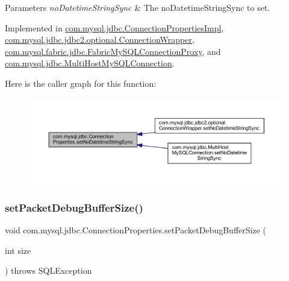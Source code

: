 \begin{DoxyParams}{Parameters}
{\em no\+Datetime\+String\+Sync} & The no\+Datetime\+String\+Sync to set. \\
\hline
\end{DoxyParams}


Implemented in \mbox{\hyperlink{classcom_1_1mysql_1_1jdbc_1_1_connection_properties_impl_acd5096d201db849e11a80ddfb49c5c7e}{com.\+mysql.\+jdbc.\+Connection\+Properties\+Impl}}, \mbox{\hyperlink{classcom_1_1mysql_1_1jdbc_1_1jdbc2_1_1optional_1_1_connection_wrapper_a5df2417575df4f6bdb7ba14ffc39b979}{com.\+mysql.\+jdbc.\+jdbc2.\+optional.\+Connection\+Wrapper}}, \mbox{\hyperlink{classcom_1_1mysql_1_1fabric_1_1jdbc_1_1_fabric_my_s_q_l_connection_proxy_ad51b7b9b87850ca32269c06ce9bac11c}{com.\+mysql.\+fabric.\+jdbc.\+Fabric\+My\+S\+Q\+L\+Connection\+Proxy}}, and \mbox{\hyperlink{classcom_1_1mysql_1_1jdbc_1_1_multi_host_my_s_q_l_connection_a1996dbebf438d31e262c88898b0fbba0}{com.\+mysql.\+jdbc.\+Multi\+Host\+My\+S\+Q\+L\+Connection}}.

Here is the caller graph for this function\+:\nopagebreak
\begin{figure}[H]
\begin{center}
\leavevmode
\includegraphics[width=350pt]{interfacecom_1_1mysql_1_1jdbc_1_1_connection_properties_a01c8815660b50a6db2e6f89f796e3ee9_icgraph}
\end{center}
\end{figure}
\mbox{\label{interfacecom_1_1mysql_1_1jdbc_1_1_connection_properties_ae0414fc9a146276fb458dc6e6b423f98}} 
\subsubsection{\texorpdfstring{set\+Packet\+Debug\+Buffer\+Size()}{setPacketDebugBufferSize()}}
{\footnotesize\ttfamily void com.\+mysql.\+jdbc.\+Connection\+Properties.\+set\+Packet\+Debug\+Buffer\+Size (\begin{DoxyParamCaption}\item[{int}]{size }\end{DoxyParamCaption}) throws S\+Q\+L\+Exception}


